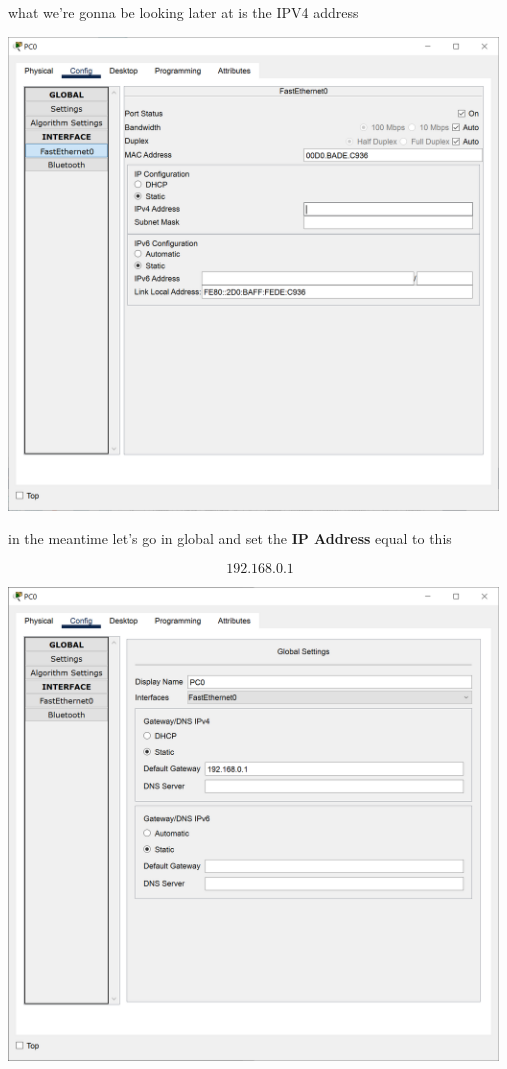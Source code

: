 \documentclass[a4paper,12pt]{book}
\begin{document}
\noindent what we're gonna be looking later at is the IPV4 address \newline

\noindent \includegraphics[width=13cm]{./step-by-step/5.PNG}
\clearpage

\noindent in the meantime let's  go in global and set the \textbf{IP Address} equal to this 

\[192.168.0.1\]

\noindent \includegraphics[width=13cm]{./step-by-step/6.PNG}
\clearpage
\end{document}
